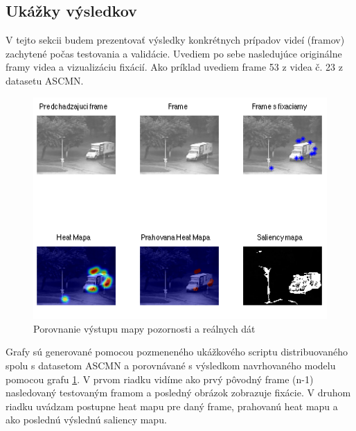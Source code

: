 \subsection{Ukážky výsledkov}
V tejto sekcii budem prezentovať výsledky konkrétnych prípadov videí (framov) zachytené počas testovania a validácie.
Uvediem po sebe nasledujúce originálne framy videa a vizualizáciu fixácií. Ako príklad uvediem frame 53 z videa č. 23 z datasetu ASCMN\cite{accv}.
\begin{figure}[H]
  \centering
  \includegraphics[width=14cm]{pics/ACCV-23-54-compare.png}
  \caption{Porovnanie výstupu mapy pozornosti a reálnych dát}
  \label{fig:ASCMN-53-23}
  \vspace{10mm}
\end{figure}
Grafy sú generované pomocou pozmeneného ukážkového scriptu distribuovaného spolu s datasetom ASCMN\cite{accv} a porovnávané s výsledkom navrhovaného modelu pomocou grafu \ref{fig:ASCMN-53-23}.
V prvom riadku vidíme ako prvý pôvodný frame (n-1) nasledovaný testovaným framom a posledný obrázok zobrazuje fixácie.
V druhom riadku uvádzam postupne heat mapu pre daný frame, prahovanú heat mapu a ako poslednú výslednú saliency mapu.

